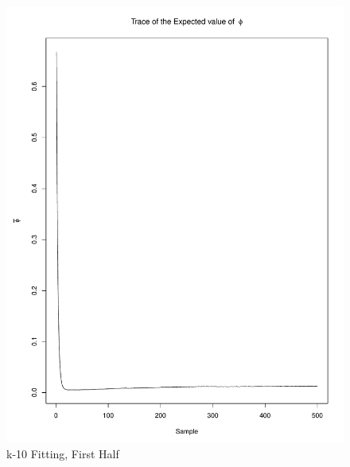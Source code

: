 \documentclass[11pt]{labbook}
\begin{document}
    \begin{figure}
        \centering
        \includegraphics[scale=.65]{FONSE_Plots/2016/December_14/k-10_expectedPhi5000}
        \caption{k-10 Fitting, First Half}
        \label{fig:k-10_1EPHI}
    \end{figure}
\end{document}
